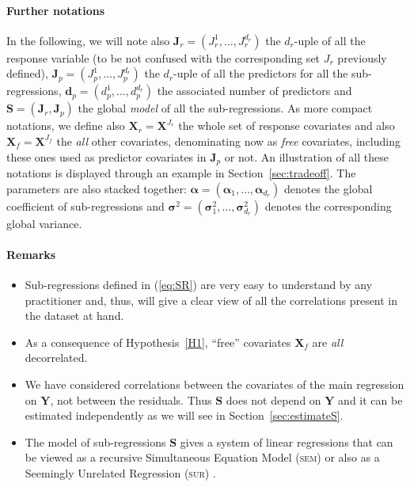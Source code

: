 \documentclass[11pt,a4paper]{article}
\begin{document}
\paragraph{Further notations} In the following, we will note also $\boldsymbol{J}_r=(J_{r}^1,\ldots,J_r^{d_r})$ the $d_r$-uple of all the response variable (to be not confused with the corresponding set $J_r$ previously defined), $\boldsymbol{J}_p=(J_{p}^1,\ldots,J_p^{d_r})$ the $d_r$-uple of all the predictors for all the sub-regressions, $\boldsymbol{d}_p=(d_p^1,\ldots,d_p^{d_{r}})$ the associated number of predictors and $\boldsymbol{S}=(\boldsymbol{J}_r,\boldsymbol{J}_p)$ the global {\it model} of all the sub-regressions. As more compact notations, we define also $\boldsymbol{X}_r=\boldsymbol{X}^{J_{r}}$ the whole set of response covariates and also $\boldsymbol{X}_f=\boldsymbol{X}^{J_{f}}$ the {\it all} other covariates, denominating now as {\it free} covariates, including these ones used as predictor covariates in $\boldsymbol{J}_p$ or not. An illustration of all these notations is displayed through an example in Section~\ref{sec:tradeoff}. The parameters are also stacked together: $\boldsymbol{\alpha}=(\boldsymbol{\alpha}_1,\ldots,\boldsymbol{\alpha}_{d_r})$ denotes the global coefficient of sub-regressions and $\boldsymbol{\sigma}^2=(\boldsymbol{\sigma}^2_1,\ldots,\boldsymbol{\sigma}^2_{d_r})$ denotes the corresponding global variance.

\paragraph{Remarks}
\begin{itemize}
\item Sub-regressions defined in (\ref{eq:SR}) are very easy to understand by any practitioner and, thus, will give a clear view of all the correlations present in the dataset at hand.
\item As a consequence of Hypothesis~\ref{H1}, ``free'' covariates $\boldsymbol{X}_f$ are {\it all} decorrelated.
\item We have considered correlations between the covariates of the main regression on $\boldsymbol{Y}$, not between the residuals. Thus $\boldsymbol{S}$ does not depend on $\boldsymbol{Y}$ and it can be estimated independently as we will see in Section~\ref{sec:estimateS}.
\item The model of sub-regressions $\boldsymbol{S}$ gives a system of linear regressions that can be viewed as a recursive Simultaneous Equation Model (\textsc{sem})\cite{davidson1993estimation,TIMM} or also as a Seemingly Unrelated Regression (\textsc{sur}) \cite{SURzellner}. 
\end{itemize} 
\end{document}
